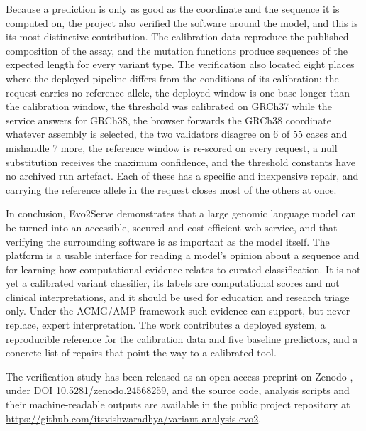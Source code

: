 Because a prediction is only as good as the coordinate and the sequence it is computed on, the project also verified the software around the model, and this is its most distinctive contribution. The calibration data reproduce the published composition of the assay, and the mutation functions produce sequences of the expected length for every variant type. The verification also located eight places where the deployed pipeline differs from the conditions of its calibration: the request carries no reference allele, the deployed window is one base longer than the calibration window, the threshold was calibrated on GRCh37 while the service answers for GRCh38, the browser forwards the GRCh38 coordinate whatever assembly is selected, the two validators disagree on 6 of 55 cases and mishandle 7 more, the reference window is re-scored on every request, a null substitution receives the maximum confidence, and the threshold constants have no archived run artefact. Each of these has a specific and inexpensive repair, and carrying the reference allele in the request closes most of the others at once.

In conclusion, Evo2Serve demonstrates that a large genomic language model can be turned into an accessible, secured and cost-efficient web service, and that verifying the surrounding software is as important as the model itself. The platform is a usable interface for reading a model's opinion about a sequence and for learning how computational evidence relates to curated classification. It is not yet a calibrated variant classifier, its labels are computational scores and not clinical interpretations, and it should be used for education and research triage only. Under the ACMG/AMP framework such evidence can support, but never replace, expert interpretation. The work contributes a deployed system, a reproducible reference for the calibration data and five baseline predictors, and a concrete list of repairs that point the way to a calibrated tool.

The verification study has been released as an open-access preprint on Zenodo \cite{shet2026evo2serve}, under DOI 10.5281/zenodo.24568259, and the source code, analysis scripts and their machine-readable outputs are available in the public project repository at \url{https://github.com/itsvishwaradhya/variant-analysis-evo2}.

